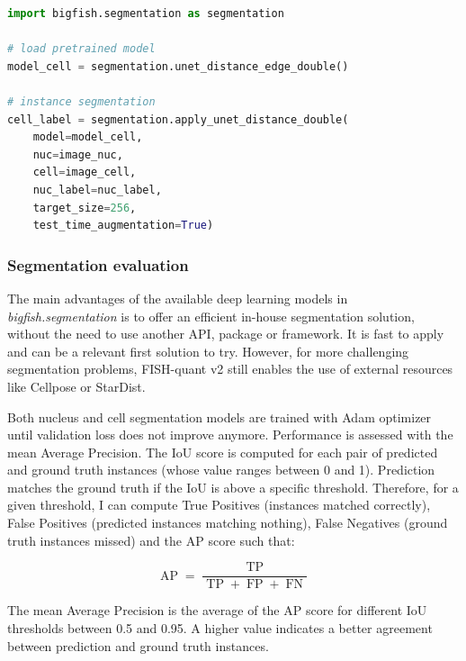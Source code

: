 \begin{minipage}{0.9\textwidth}
\begin{lstlisting}[language=Python]
import bigfish.segmentation as segmentation

# load pretrained model
model_cell = segmentation.unet_distance_edge_double()

# instance segmentation
cell_label = segmentation.apply_unet_distance_double(
    model=model_cell,
    nuc=image_nuc,
    cell=image_cell,
    nuc_label=nuc_label,
    target_size=256,
	test_time_augmentation=True)
\end{lstlisting}
\end{minipage}

\subsubsection{Segmentation evaluation}

The main advantages of the available deep learning models in \emph{bigfish.segmentation} is to offer an efficient in-house segmentation solution, without the need to use another API, package or framework.
It is fast to apply and can be a relevant first solution to try.
However, for more challenging segmentation problems, FISH-quant v2 still enables the use of external resources like Cellpose or StarDist.

Both nucleus and cell segmentation models are trained with Adam optimizer~\cite{Diederik_2015} until validation loss does not improve anymore.
Performance is assessed with the mean Average Precision.
The \ac{IoU} score is computed for each pair of predicted and ground truth instances (whose value ranges between 0 and 1).
Prediction matches the ground truth if the \ac{IoU} is above a specific threshold.
Therefore, for a given threshold, I can compute True Positives (instances matched correctly), False Positives (predicted instances matching nothing), False Negatives (ground truth instances missed) and the \ac{AP} score such that:

\begin{equation}
	{\displaystyle \operatorname{AP} = \frac{\operatorname{TP}}{\operatorname{TP} + \operatorname{FP} + \operatorname{FN}}}
\end{equation}

The mean Average Precision is the average of the \ac{AP} score for different \ac{IoU} thresholds between 0.5 and 0.95.
A higher value indicates a better agreement between prediction and ground truth instances.

